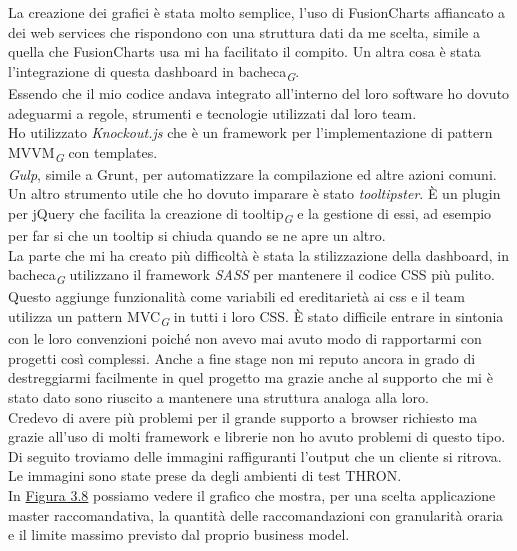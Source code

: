 \documentclass[a4paper, 12pt, twoside, openright]{book}
\newcommand{\gloss}[1]{#1\textsubscript{\textit{\tiny{G}}}}
\begin{document}
La creazione dei grafici è stata molto semplice, l'uso di FusionCharts affiancato a dei web services che rispondono con una struttura dati da me scelta, simile a quella che FusionCharts usa mi ha facilitato il compito. Un altra cosa è stata l'integrazione di questa dashboard in \gloss{bacheca}.\\
Essendo che il mio codice andava integrato all'interno del loro software ho dovuto adeguarmi a regole, strumenti e tecnologie utilizzati dal loro team.\\
Ho utilizzato \textit{Knockout.js} che è un framework per l'implementazione di pattern \gloss{MVVM} con templates.\\
\textit{Gulp}, simile a Grunt, per automatizzare la compilazione ed altre azioni comuni.\\
Un altro strumento utile che ho dovuto imparare è stato \textit{tooltipster}. \`{E} un plugin per jQuery che facilita la creazione di \gloss{tooltip} e la gestione di essi, ad esempio per far si che un tooltip si chiuda quando se ne apre un altro.\\
La parte che mi ha creato più difficoltà è stata la stilizzazione della dashboard, in \gloss{bacheca} utilizzano il framework \textit{SASS} per mantenere il codice CSS più pulito. Questo aggiunge funzionalità come variabili ed ereditarietà ai css e il team utilizza un pattern \gloss{MVC} in tutti i loro CSS. \`{E} stato difficile entrare in sintonia con le loro convenzioni poiché non avevo mai avuto modo di rapportarmi con progetti così complessi. Anche a fine stage non mi reputo ancora in grado di destreggiarmi facilmente in quel progetto ma grazie anche al supporto che mi è stato dato sono riuscito a mantenere una struttura analoga alla loro.\\
Credevo di avere più problemi per il grande supporto a browser richiesto ma grazie all'uso di molti framework e librerie non ho avuto problemi di questo tipo.\\
Di seguito troviamo delle immagini raffiguranti l'output che un cliente si ritrova. Le immagini sono state prese da degli ambienti di test THRON.\\
In \hyperref[grafico-quantitativo]{Figura 3.8} possiamo vedere il grafico che mostra, per una scelta applicazione master raccomandativa, la quantità delle raccomandazioni con granularità oraria e il limite massimo previsto dal proprio business model. 
\end{document}
